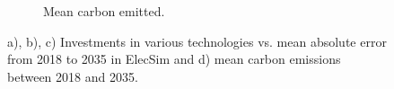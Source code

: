 \documentclass[final,3p,times,twocolumn,numbers]{elsarticle}
\begin{document}
\begin{figure}
\begin{subfigure}[b]{0.475\textwidth}
\caption{Mean carbon emitted.}
\label{fig:Carbon_emitted_mean_output}
\end{subfigure}
\caption{a), b), c) Investments in various technologies vs. mean absolute error from 2018 to 2035 in ElecSim and d) mean carbon emissions between 2018 and 2035.}
\end{figure}






%
%
%
%
%








\end{document}
